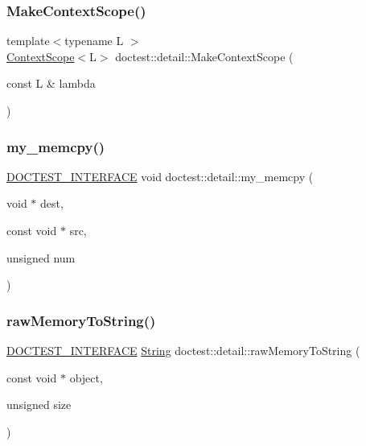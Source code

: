 \mbox{\label{namespacedoctest_1_1detail_a193493f40330f096b9e1b78557a832a3}} 
\subsubsection{\texorpdfstring{Make\+Context\+Scope()}{MakeContextScope()}}
{\footnotesize\ttfamily template$<$typename L $>$ \\
\mbox{\hyperlink{classdoctest_1_1detail_1_1_context_scope}{Context\+Scope}}$<$L$>$ doctest\+::detail\+::\+Make\+Context\+Scope (\begin{DoxyParamCaption}\item[{const L \&}]{lambda }\end{DoxyParamCaption})}

\mbox{\label{namespacedoctest_1_1detail_a4027cb5407ce2ff132645e89bba97010}} 
\subsubsection{\texorpdfstring{my\+\_\+memcpy()}{my\_memcpy()}}
{\footnotesize\ttfamily \mbox{\hyperlink{doctest_8h_a9c16ffc635ec47f07797d21ede26b1a5}{D\+O\+C\+T\+E\+S\+T\+\_\+\+I\+N\+T\+E\+R\+F\+A\+CE}} void doctest\+::detail\+::my\+\_\+memcpy (\begin{DoxyParamCaption}\item[{void $\ast$}]{dest,  }\item[{const void $\ast$}]{src,  }\item[{unsigned}]{num }\end{DoxyParamCaption})}

\mbox{\label{namespacedoctest_1_1detail_adb894f73b88fb3b39d6c48d80451f5ff}} 
\subsubsection{\texorpdfstring{raw\+Memory\+To\+String()}{rawMemoryToString()}\hspace{0.1cm}{\footnotesize\ttfamily [1/2]}}
{\footnotesize\ttfamily \mbox{\hyperlink{doctest_8h_a9c16ffc635ec47f07797d21ede26b1a5}{D\+O\+C\+T\+E\+S\+T\+\_\+\+I\+N\+T\+E\+R\+F\+A\+CE}} \mbox{\hyperlink{classdoctest_1_1_string}{String}} doctest\+::detail\+::raw\+Memory\+To\+String (\begin{DoxyParamCaption}\item[{const void $\ast$}]{object,  }\item[{unsigned}]{size }\end{DoxyParamCaption})}

